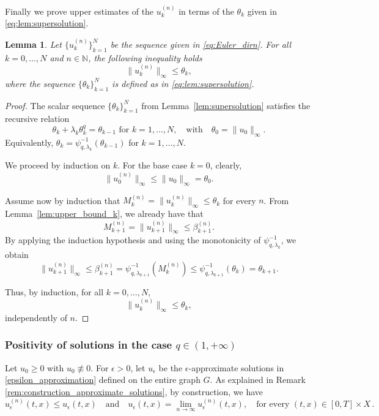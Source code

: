 \documentclass[journal]{article}
\theoremstyle{nonitalic}
\theoremstyle{nonitalic}
\theoremstyle{plain} %
\newtheorem{lemma}[theorem]{Lemma}
\numberwithin{equation}{section}
\newcommand{\N}{\mathbb{N}}
\begin{document}
Finally we prove upper estimates of the $u_k^{(n)}$ in terms of the $\theta_k$ given in \eqref{eq:lem:supersolution}.

\begin{lemma}\label{lem:upper_barrier_bound}
Let $\{u_k^{(n)}\}_{k=1}^N$ be the sequence given in \eqref{eq:Euler_dirn}. For all $k=0,\ldots, N$ and $n\in \N$, the following inequality holds 
$$\|u_k^{(n)}\|_\infty \leq \theta_k,$$ where the sequence $\{\theta_k\}_{k=1}^N$ is defined as in \eqref{eq:lem:supersolution}.
\end{lemma}


\begin{proof}
The scalar sequence $\{\theta_k\}_{k=1}^N$ from Lemma~\ref{lem:supersolution} satisfies the recursive relation
\[
\theta_k + \lambda_k\theta_k^{q} = \theta_{k-1} \mbox{ for } k=1,\ldots, N, \quad \text{with} \quad \theta_0 = \|u_0\|_\infty.
\]
Equivalently, $\theta_k = \psi_{q,\lambda_k}^{-1}(\theta_{k-1})$ for $k=1,\ldots, N$.

We proceed by induction on $k$. For the base case $k=0$, clearly,
\[
\|u_0^{(n)}\|_\infty \leq \|u_0\|_\infty = \theta_0.
\]


Assume now by induction that $M_{k}^{(n)} = \|u_{k}^{(n)}\|_\infty \leq \theta_k$ for every $n$. From Lemma~\ref{lem:upper_bound_k}, we already have that
\[
M_{k+1}^{(n)} = \|u_{k+1}^{(n)}\|_\infty \leq \beta_{k+1}^{(n)}.
\]
By applying the induction hypothesis and using the monotonicity of $\psi_{q,\lambda_k}^{-1}$, we obtain
\[
\|u_{k+1}^{(n)}\|_\infty \leq \beta_{k+1}^{(n)} = \psi_{q,\lambda_{k+1}}^{-1}(M_{k}^{(n)}) \leq \psi_{q,\lambda_{k+1}}^{-1}(\theta_k) = \theta_{k+1}.
\]


Thus, by induction, for all $k = 0, \ldots, N$,
\[
\|u_k^{(n)}\|_\infty \leq \theta_k,
\]
independently of $n$.
\end{proof}

\subsubsection{Positivity of solutions in the case $q\in (1,+\infty)$}\label{positivity}


Let $u_0 \geq 0$ with $u_0\not \equiv 0$. For $\epsilon > 0$, let $u_\epsilon$ be the $\epsilon$-approximate solutions in \eqref{epsilon_approximation} defined on the entire graph $G$.   As explained in Remark \ref{rem:construction_approximate_solutions}, by construction, we have
\begin{equation}\label{lim_n_eps}
u_\epsilon^{(n)}(t,x) \leq u_\epsilon (t,x) \quad \text{and} \quad u_\epsilon(t,x) = \lim_{n \to \infty} u_\epsilon^{(n)}(t,x), \quad \text{for every } (t,x)\in [0,T]\times X\,.
\end{equation}
\end{document}
